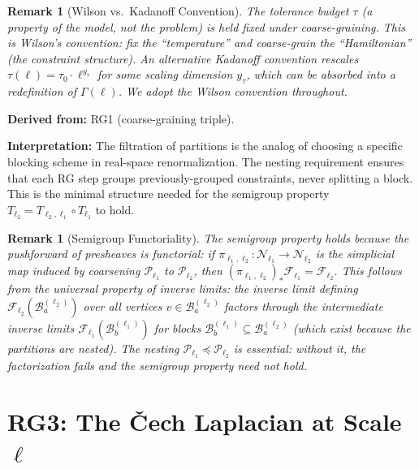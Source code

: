 \documentclass[11pt,letterpaper]{article}
\newtheorem{remark}[conjecture]{Remark}
\newcommand{\sheaf}{\mathcal{F}}
\newcommand{\nerve}{\mathcal{N}}
\newcommand{\block}{\mathcal{B}}
\newcommand{\partition}{\mathcal{P}}
\begin{document}
\begin{remark}[Wilson vs.\ Kadanoff Convention]\label{rem:wilson}
The tolerance budget $\tau$ (a property of the model, not the 
problem) is held fixed under coarse-graining. This is Wilson's 
convention: fix the ``temperature'' and coarse-grain the 
``Hamiltonian'' (the constraint structure). An alternative 
Kadanoff convention rescales $\tau(\ell) = \tau_0 \cdot 
\ell^{y_\tau}$ for some scaling dimension $y_\tau$, which can be 
absorbed into a redefinition of $\Gamma(\ell)$. We adopt the Wilson 
convention throughout.
\end{remark}

\textbf{Derived from:} RG1 (coarse-graining triple).

\textbf{Interpretation:} The filtration of partitions is the analog 
of choosing a specific blocking scheme in real-space 
renormalization. The nesting requirement ensures that each RG step 
groups previously-grouped constraints, never splitting a block. 
This is the minimal structure needed for the semigroup property 
$T_{\ell_2} = T_{\ell_2, \ell_1} \circ T_{\ell_1}$ to hold.

\begin{remark}[Semigroup Functoriality]\label{rem:semigroup}
The semigroup property holds because the pushforward of presheaves 
is functorial: if $\pi_{\ell_1, \ell_2} : \nerve_{\ell_1} \to 
\nerve_{\ell_2}$ is the simplicial map induced by coarsening 
$\partition_{\ell_1}$ to $\partition_{\ell_2}$, then 
$(\pi_{\ell_1, \ell_2})_* \sheaf_{\ell_1} = \sheaf_{\ell_2}$. 
This follows from the universal property of inverse limits: the 
inverse limit defining $\sheaf_{\ell_2}(\block_a^{(\ell_2)})$ over 
all vertices $v \in \block_a^{(\ell_2)}$ factors through the 
intermediate inverse limits $\sheaf_{\ell_1}(\block_b^{(\ell_1)})$ 
for blocks $\block_b^{(\ell_1)} \subseteq \block_a^{(\ell_2)}$ 
(which exist because the partitions are nested). The nesting 
$\partition_{\ell_1} \preccurlyeq \partition_{\ell_2}$ is essential: 
without it, the factorization fails and the semigroup property 
need not hold.
\end{remark}

\section{RG3: The \v{C}ech Laplacian at Scale $\ell$}
\end{document}
